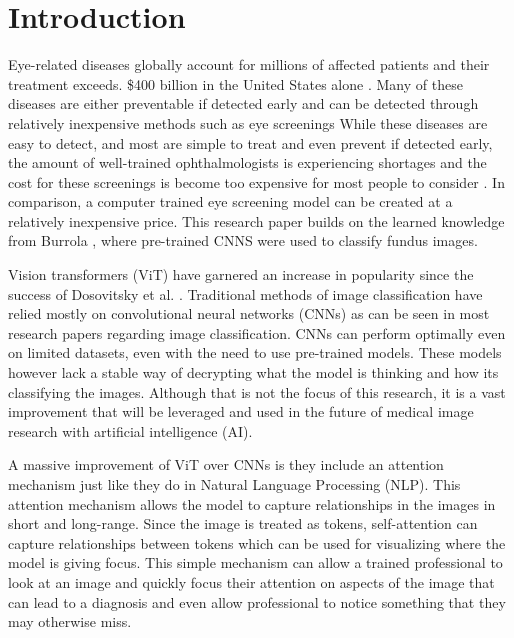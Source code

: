 \documentclass[sigconf]{acmart}
\begin{document}

\maketitle

\section{Introduction}
Eye-related diseases globally account for millions of affected patients and their treatment exceeds. \$400 billion in the United States alone \cite{Deangelis}. Many of these diseases are either preventable if detected early and can be detected through relatively inexpensive methods such as eye screenings \cite{Forouhi}  While these diseases are easy to detect, and most are simple to treat and even prevent if detected early, the amount of well-trained ophthalmologists is experiencing shortages and the cost for these screenings is become too expensive for most people to consider \cite{Cherlaramani}. In comparison, a computer trained eye screening model can be created at a relatively inexpensive price. This research paper builds on the learned knowledge from Burrola \cite{Burrola}, where pre-trained CNNS were used to classify fundus images.

Vision transformers (ViT) have garnered an increase in popularity since
the success of Dosovitsky et al. \cite{Dosovitskiy}. Traditional methods of image classification have relied mostly on convolutional neural networks (CNNs) as can be seen in most research papers regarding image classification. CNNs can perform optimally even on limited datasets, even with the need to use pre-trained models. These models however lack a stable way of decrypting what the model is thinking and how its classifying the images. Although that is not the focus of this research, it is a vast improvement that will be leveraged and used in the future of medical image research with artificial intelligence (AI). 

A massive improvement of ViT over CNNs is they include an attention mechanism just like they do in Natural Language Processing (NLP). This attention mechanism allows the model to capture relationships in the images in short and long-range. Since the image is treated as tokens, self-attention can capture relationships between tokens which can be used for visualizing where the model is giving focus. This simple mechanism can allow a trained professional to look at an image and quickly focus their attention on aspects of the image that can lead to a diagnosis and even allow professional to notice something that they may otherwise miss.
\end{document}

